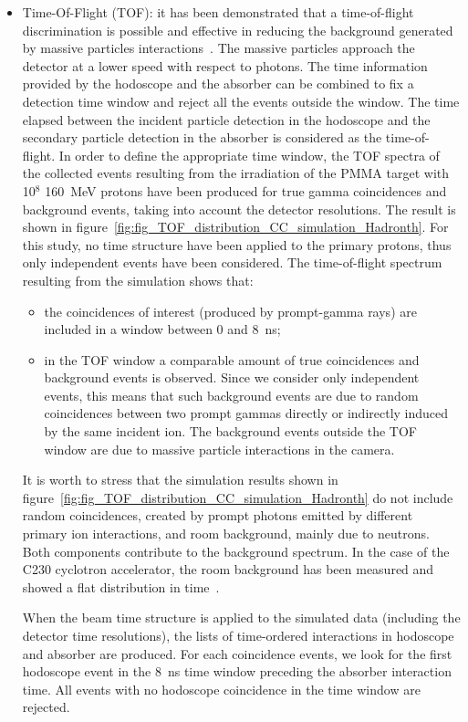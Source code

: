 \begin{itemize}
\item Time-Of-Flight (TOF): it has been demonstrated that a time-of-flight discrimination is possible and effective in reducing the background generated by massive particles interactions~\cite{Testa:2010aa}. The massive particles approach the detector at a lower speed with respect to photons. The time information provided by the hodoscope and the absorber can be combined to fix a detection time window and reject all the events outside the window. The time elapsed between the incident particle detection in the hodoscope and the secondary particle detection in the absorber is considered as the time-of-flight. In order to define the appropriate time window, the TOF spectra of the collected events resulting from the irradiation of the PMMA target with 10$^{8}$ 160~MeV protons have been produced for true gamma coincidences and background events, taking into account the detector resolutions. The result is shown in figure~\ref{fig:fig_TOF_distribution_CC_simulation_Hadronth}. For this study, no time structure have been applied to the primary protons, thus only independent events have been considered. The time-of-flight spectrum resulting from the simulation shows that:
\begin{itemize}
\item the coincidences of interest (produced by prompt-gamma rays) are included in a window between 0 and 8~ns;
\item in the TOF window a comparable amount of true coincidences and background events is observed. Since we consider only independent events, this means that such background events are due to random coincidences between two prompt gammas directly or indirectly induced by the same incident ion. The background events outside the TOF window are due to massive particle interactions in the camera.
\end{itemize}
It is worth to stress that the simulation results shown in figure~\ref{fig:fig_TOF_distribution_CC_simulation_Hadronth} do not include random coincidences, created by prompt photons emitted by different primary ion interactions, and room background, mainly due to neutrons. Both components contribute to the background spectrum. In the case of the C230 cyclotron accelerator, the room background has been measured and showed a flat distribution in time~\cite{Pinto2014}.

When the beam time structure is applied to the simulated data (including the detector time resolutions), the lists of time-ordered interactions in hodoscope and absorber are produced. For each coincidence events, we look for the first hodoscope event in the 8~ns time window preceding the absorber interaction time. All events with no hodoscope coincidence in the time window are rejected.


\end{itemize}
